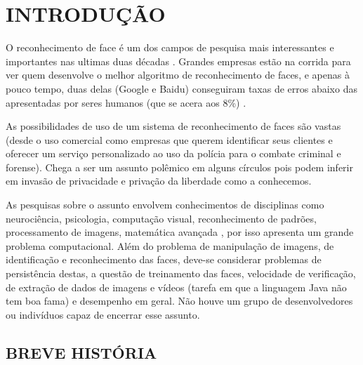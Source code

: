 
\chapter{INTRODUÇÃO}\label{ch:introducao}

O reconhecimento de face é um dos campos de pesquisa mais interessantes e importantes nas ultimas duas décadas \cite{wei_lun}. Grandes empresas estão na corrida para ver quem desenvolve o melhor algoritmo de reconhecimento de faces, e apenas à pouco tempo, duas delas (Google e Baidu) conseguiram taxas de erros abaixo das apresentadas por seres humanos (que se acera aos 8\%) \cite{stats_economy_compass_2017}.

As possibilidades de uso de um sistema de reconhecimento de faces são vastas (desde o uso comercial como empresas que querem identificar seus clientes e oferecer um serviço personalizado ao uso da polícia para o combate criminal e forense). Chega a ser um assunto polêmico em alguns círculos pois podem inferir em invasão de privacidade e privação da liberdade como a conhecemos.

As pesquisas sobre o assunto envolvem conhecimentos de disciplinas como neurociência, psicologia, computação visual, reconhecimento de padrões, processamento de imagens, matemática avançada \cite{wei_lun}, por isso apresenta um grande problema computacional. Além do problema de manipulação de imagens,  de identificação e reconhecimento das faces, deve-se considerar problemas de persistência destas, a questão de treinamento das faces, velocidade de verificação, de extração de dados de imagens e vídeos (tarefa em que a linguagem Java não tem boa fama) e desempenho em geral. Não houve um grupo de desenvolvedores ou indivíduos capaz de encerrar esse assunto.


\section{BREVE HISTÓRIA}\label{sec:historia}

